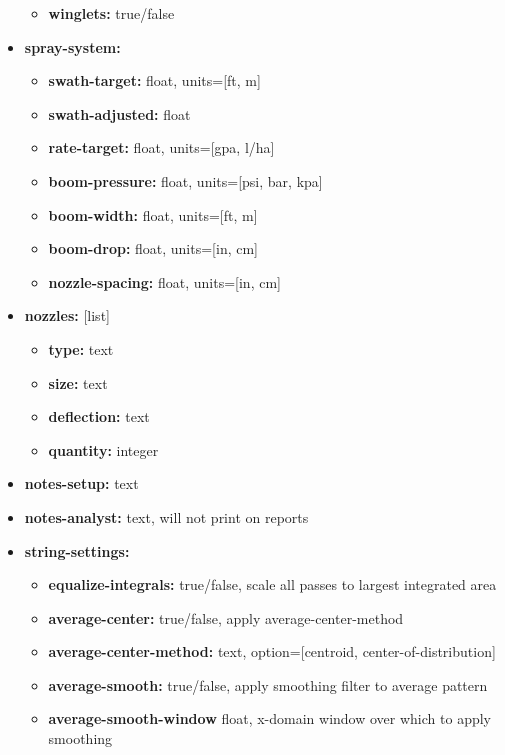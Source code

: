 \documentclass[10pt,letterpaper,titlepage]{article}
\begin{document}
\begin{itemize}
\begin{itemize}
            \item \textbf{winglets:} true/false
        \end{itemize}
        \item \textbf{spray-system:} 
        \begin{itemize}
            \item \textbf{swath-target:} float, units=[ft, m]
            \item \textbf{swath-adjusted:} float
            \item \textbf{rate-target:} float, units=[gpa, l/ha]
            \item \textbf{boom-pressure:} float, units=[psi, bar, kpa]
            \item \textbf{boom-width:} float, units=[ft, m]
            \item \textbf{boom-drop:} float, units=[in, cm]
            \item \textbf{nozzle-spacing:} float, units=[in, cm]
        \end{itemize}
        \item \textbf{nozzles:} [list]
        \begin{itemize}
            \item \textbf{type:} text
            \item \textbf{size:} text
            \item \textbf{deflection:} text
            \item \textbf{quantity:} integer
        \end{itemize}
        \item \textbf{notes-setup:} text
        \item \textbf{notes-analyst:} text, will not print on reports
        \item \textbf{string-settings:} 
        \begin{itemize}
            \item \textbf{equalize-integrals:} true/false, scale all passes to largest integrated area
            \item \textbf{average-center:} true/false, apply average-center-method
            \item \textbf{average-center-method:} text, option=[centroid, center-of-distribution]
            \item \textbf{average-smooth:} true/false, apply smoothing filter to average pattern
            \item \textbf{average-smooth-window} float, x-domain window over which to apply smoothing

\end{itemize}
\end{itemize}
\end{document}

